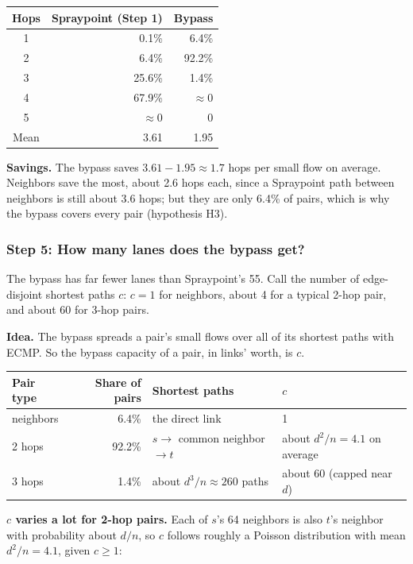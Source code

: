 \begin{center}
\begin{tabular}{@{}crr@{}}
\toprule
Hops & Spraypoint (Step 1) & Bypass \\
\midrule
1 & 0.1\% & 6.4\% \\
2 & 6.4\% & 92.2\% \\
3 & 25.6\% & 1.4\% \\
4 & 67.9\% & $\approx 0$ \\
5 & $\approx 0$ & 0 \\
\midrule
Mean & 3.61 & 1.95 \\
\bottomrule
\end{tabular}
\end{center}

\textbf{Savings.} The bypass saves $3.61 - 1.95 \approx 1.7$ hops per small flow on average. Neighbors save the most, about 2.6 hops each, since a Spraypoint path between neighbors is still about 3.6 hops; but they are only 6.4\% of pairs, which is why the bypass covers every pair (hypothesis H3).

\subsubsection{Step 5: How many lanes does the bypass get?}

The bypass has far fewer lanes than Spraypoint's 55. Call the number of edge-disjoint shortest paths $c$: $c = 1$ for neighbors, about 4 for a typical 2-hop pair, and about 60 for 3-hop pairs.

\textbf{Idea.} The bypass spreads a pair's small flows over all of its shortest paths with ECMP. So the bypass capacity of a pair, in links' worth, is $c$.

\begin{center}
\begin{tabularx}{\linewidth}{@{}l r L L@{}}
\toprule
Pair type & Share of pairs & Shortest paths & $c$ \\
\midrule
neighbors & 6.4\% & the direct link & 1 \\
2 hops & 92.2\% & $s \to$ common neighbor $\to t$ & about $d^2/n = 4.1$ on average \\
3 hops & 1.4\% & about $d^3/n \approx 260$ paths & about 60 (capped near $d$) \\
\bottomrule
\end{tabularx}
\end{center}

\textbf{$c$ varies a lot for 2-hop pairs.} Each of $s$'s 64 neighbors is also $t$'s neighbor with probability about $d/n$, so $c$ follows roughly a Poisson distribution with mean $d^2/n = 4.1$, given $c \ge 1$:


